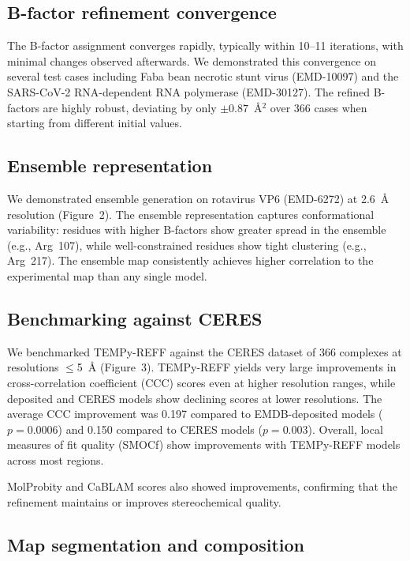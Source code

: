 \documentclass[11pt]{article}
\begin{document}
\subsection{B-factor refinement convergence}

The B-factor assignment converges rapidly, typically within 10--11 iterations, with minimal changes observed afterwards. We demonstrated this convergence on several test cases including Faba bean necrotic stunt virus (EMD-10097) and the SARS-CoV-2 RNA-dependent RNA polymerase (EMD-30127). The refined B-factors are highly robust, deviating by only $\pm 0.87$~\AA$^2$ over 366 cases when starting from different initial values.

\subsection{Ensemble representation}

We demonstrated ensemble generation on rotavirus VP6 (EMD-6272) at 2.6~\AA{} resolution (Figure~2). The ensemble representation captures conformational variability: residues with higher B-factors show greater spread in the ensemble (e.g., Arg~107), while well-constrained residues show tight clustering (e.g., Arg~217). The ensemble map consistently achieves higher correlation to the experimental map than any single model.

\subsection{Benchmarking against CERES}

We benchmarked TEMPy-REFF against the CERES dataset \citep{ceres2022} of 366 complexes at resolutions $\leq$5~\AA{} (Figure~3). TEMPy-REFF yields very large improvements in cross-correlation coefficient (CCC) scores even at higher resolution ranges, while deposited and CERES models show declining scores at lower resolutions. The average CCC improvement was 0.197 compared to EMDB-deposited models ($p = 0.0006$) and 0.150 compared to CERES models ($p = 0.003$). Overall, local measures of fit quality (SMOCf) \citep{joseph2016} show improvements with TEMPy-REFF models across most regions.

MolProbity \citep{williams2018} and CaBLAM \citep{richardson2018} scores also showed improvements, confirming that the refinement maintains or improves stereochemical quality.

\subsection{Map segmentation and composition}
\end{document}
